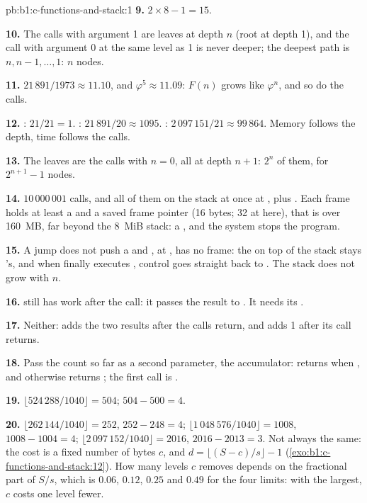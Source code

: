 \begin{solution}{pb:b1:c-functions-and-stack:1}
\textbf{9.} $2 \times 8 - 1 = 15$.

\textbf{10.} The calls with argument 1 are leaves at depth $n$ (root at depth 1), and the call with argument 0 at the
same level as 1 is never deeper; the deepest path is $n, n-1, \dots, 1$: $n$ nodes.

\textbf{11.} $21\,891 / 1973 \approx 11.10$, and $\varphi^5 \approx 11.09$: $F(n)$ grows like $\varphi^n$, and so do the
calls.

\textbf{12.} : $21/21 = 1$. : $21\,891/20 \approx 1095$. : $2\,097\,151/21 \approx
99\,864$. Memory follows the depth, time follows the calls.

\textbf{13.} The leaves are the calls with $n = 0$, all at depth $n + 1$: $2^n$ of them, for $2^{n+1} - 1$ nodes.

\textbf{14.} $10\,000\,001$ calls, and all of them on the stack at once at , plus . Each frame
holds at least a  and a saved frame pointer (16 bytes; 32 at  here), that is over 160~MB,
far beyond the 8~MiB stack: a , and the system stops the program.

\textbf{15.} A jump does not push a  and , at , has no frame: the 
on top of the stack stays 's, and when  finally executes , control goes straight
back to . The stack does not grow with $n$.

\textbf{16.}  still has work after the call: it passes the result to . It needs its .

\textbf{17.} Neither:  adds the two results after the calls return, and  adds 1 after its
call returns.

\textbf{18.} Pass the count so far as a second parameter, the accumulator:
 returns  when , and otherwise returns
; the first call is .

\textbf{19.} $\lfloor 524\,288 / 1040 \rfloor = 504$; $504 - 500 = 4$.

\textbf{20.} $\lfloor 262\,144/1040 \rfloor = 252$, $252 - 248 = 4$; $\lfloor 1\,048\,576/1040 \rfloor = 1008$,
$1008 - 1004 = 4$; $\lfloor 2\,097\,152/1040 \rfloor = 2016$, $2016 - 2013 = 3$. Not always the same: the cost is a
fixed number of bytes $c$, and $d = \lfloor (S - c)/s \rfloor - 1$ (\cref{exo:b1:c-functions-and-stack:12}). How many
levels $c$ removes depends on the fractional part of $S/s$, which is $0.06$, $0.12$, $0.25$ and $0.49$ for the four
limits: with the largest, $c$ costs one level fewer.


\end{solution}
